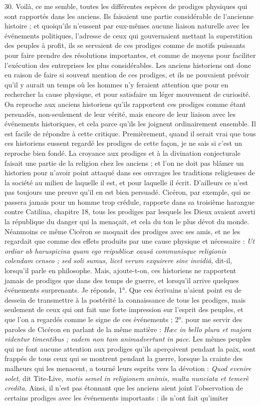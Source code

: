 \documentclass[a4paper, 11pt, oneside, polutonikogreek, french]{article}
\begin{document}
30. Voilà, ce me semble, toutes les différentes espèces de prodiges physiques qui sont rapportés dans les anciens. Ils faisaient une partie considérable de l'ancienne histoire ; et quoiqu'ils n'eussent par eux-mêmes aucune liaison naturelle avec les événements politiques, l'adresse de ceux qui gouvernaient mettant la superstition des peuples à profit, ils se servaient de ces prodiges comme de motifs puissants pour faire prendre des résolutions importantes, et comme de moyens pour faciliter l'exécution des entreprises les plus considérables. Les anciens historiens ont donc eu raison de faire si souvent mention de ces prodiges, et ils ne pouvaient prévoir qu'il y aurait un temps où les hommes n'y feraient attention que pour en rechercher la cause physique, et pour satisfaire un léger mouvement de curiosité. On reproche aux anciens historiens qu'ils rapportent ces prodiges comme étant persuadés, non-seulement de leur vérité, mais encore de leur liaison avec les événements historiques, et cela parce qu'ils les joignent ordinairement ensemble. Il est facile de répondre à cette critique. Premièrement, quand il serait vrai que tous ces historiens eussent regardé les prodiges de cette façon, je ne sais si c'est un reproche bien fondé. La croyance aux prodiges et à la divination conjecturale faisait une partie de la religion chez les anciens ; et l'on ne doit pas blâmer un historien pour n'avoir point attaqué dans ses ouvrages les traditions religieuses de la société au milieu de laquelle il est, et pour laquelle il écrit. D'ailleurs ce n'est pas toujours une preuve qu'il en est bien persuadé. Cicéron, par exemple, qui ne passera jamais pour un homme trop crédule, rapporte dans sa troisième harangue contre Catilina, chapitre 18, tous les prodiges par lesquels les Dieux avaient averti la république du danger qui la menaçait, et cela du ton le plus dévot du monde. Néanmoins ce même Cicéron se moquait des prodiges avec ses amis, et ne les regardait que comme des effets produits par une cause physique et nécessaire : \emph{Ut ordiar ab haruspicina quam ego reipublicæ causâ communisque religionis colendam censeo ; sed soli sumus, licet verum exquirere sine invidiâ}, dit-il, lorsqu'il parle en philosophe. Mais, ajoute-t-on, ces historiens ne rapportent jamais de prodiges que dans des temps de guerre, et lorsqu'il arrive quelques événements surprenants. Je réponds, 1°. Que ces écrivains n’aient point eu de dessein de transmettre à la postérité la connaissance de tous les prodiges, mais seulement de ceux qui ont fait une forte impression sur l'esprit des peuples, et que l'on a regardés comme le signe de ces événements ; 2°. pour me servir des paroles de Cicéron en parlant de la même matière : \emph{Hæc in bello plura et majora videntur timentibus ; eadem non tam animadvertunt in pace}. Les mêmes peuples qui ne font aucune attention aux prodiges qu'ils aperçoivent pendant la paix, sont frappés de tous ceux qui se montrent pendant la guerre, lorsque la crainte des malheurs qui les menacent, a tourné leurs esprits vers la dévotion : \emph{Quod evenire solet}, dit Tite-Live, \emph{motis semel in religionem animis, multa nunciata et temerè credita}. Ainsi, il n'est pas étonnant que les anciens aient joint l'observation de certains prodiges avec les événements importants : ils n'ont fait qu'imiter 
\end{document}
